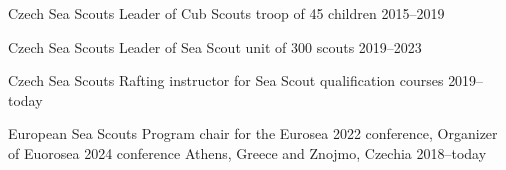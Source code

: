 



\begin{cvpubs}
\end{cvpubs}


\begin{cvhonors}
  \cvhonor
    {Czech Sea Scouts} %
    {Leader of Cub Scouts troop of 45 children} %
    {} %
    {2015--2019} %
    
  \cvhonor
    {Czech Sea Scouts} %
    {Leader of Sea Scout unit of 300 scouts} %
    {} %
    {2019--2023} %

  \cvhonor
    {Czech Sea Scouts} %
    {Rafting instructor for Sea Scout qualification courses} %
    {} %
    {2019--today} %

  \cvhonor
    {European Sea Scouts} %
    {Program chair for the Eurosea 2022 conference, Organizer of Euorosea 2024 conference} %
    {\hspace{-3em}Athens, Greece and Znojmo, Czechia} %
    {2018--today} %
    
\end{cvhonors}





